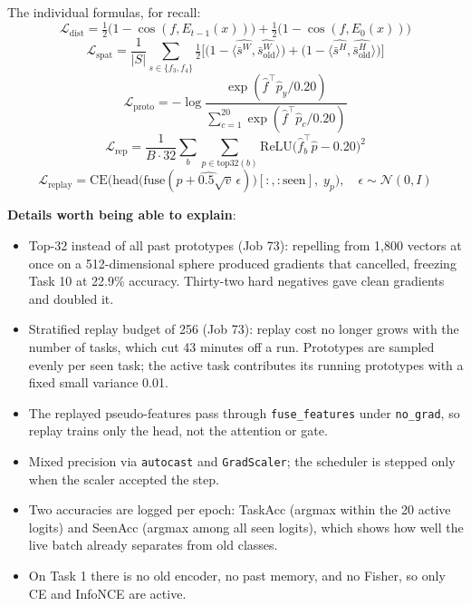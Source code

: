 \documentclass[11pt,a4paper]{article}
\newcommand{\code}[1]{\texttt{#1}}
\begin{document}
The individual formulas, for recall:
\begin{equation}
\mathcal{L}_{\mathrm{dist}} = \tfrac{1}{2}\big(1 - \cos(f, E_{t-1}(x))\big) + \tfrac{1}{2}\big(1 - \cos(f, E_0(x))\big)
\end{equation}
\begin{equation}
\mathcal{L}_{\mathrm{spat}} = \frac{1}{|S|}\sum_{s \in \{f_3, f_4\}} \tfrac{1}{2}\Big[\big(1 - \langle \widehat{\bar{s}^{W}}, \widehat{\bar{s}^{W}_{\mathrm{old}}} \rangle\big) + \big(1 - \langle \widehat{\bar{s}^{H}}, \widehat{\bar{s}^{H}_{\mathrm{old}}} \rangle\big)\Big]
\end{equation}
\begin{equation}
\mathcal{L}_{\mathrm{proto}} = -\log \frac{\exp(\hat{f}^{\top}\hat{p}_y / 0.20)}{\sum_{c=1}^{20} \exp(\hat{f}^{\top}\hat{p}_c / 0.20)}
\end{equation}
\begin{equation}
\mathcal{L}_{\mathrm{rep}} = \frac{1}{B \cdot 32}\sum_{b}\sum_{p \in \mathrm{top32}(b)} \mathrm{ReLU}\big(\hat{f}_b^{\top}\hat{p} - 0.20\big)^2
\end{equation}
\begin{equation}
\mathcal{L}_{\mathrm{replay}} = \mathrm{CE}\Big(\mathrm{head}\big(\mathrm{fuse}(\widehat{p + 0.5\sqrt{v}\,\epsilon})\big)[:, :\mathrm{seen}],\; y_p\Big), \quad \epsilon \sim \mathcal{N}(0, I)
\end{equation}

\textbf{Details worth being able to explain}:
\begin{itemize}
  \item Top-32 instead of all past prototypes (Job 73): repelling from 1{,}800 vectors at once on a 512-dimensional sphere produced gradients that cancelled, freezing Task 10 at 22.9\% accuracy. Thirty-two hard negatives gave clean gradients and doubled it.
  \item Stratified replay budget of 256 (Job 73): replay cost no longer grows with the number of tasks, which cut 43 minutes off a run. Prototypes are sampled evenly per seen task; the active task contributes its running prototypes with a fixed small variance 0.01.
  \item The replayed pseudo-features pass through \code{fuse\_features} under \code{no\_grad}, so replay trains only the head, not the attention or gate.
  \item Mixed precision via \code{autocast} and \code{GradScaler}; the scheduler is stepped only when the scaler accepted the step.
  \item Two accuracies are logged per epoch: TaskAcc (argmax within the 20 active logits) and SeenAcc (argmax among all seen logits), which shows how well the live batch already separates from old classes.
  \item On Task 1 there is no old encoder, no past memory, and no Fisher, so only CE and InfoNCE are active.
\end{itemize}
\end{document}
